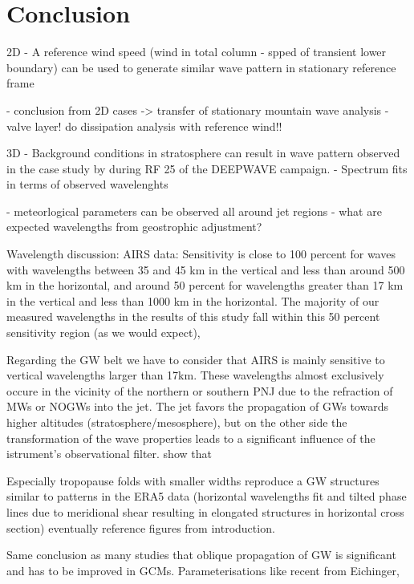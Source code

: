 \chapter{Conclusion}


2D
- A reference wind speed (wind in total column - spped of transient lower boundary) can be used to generate similar wave pattern in stationary reference frame

- conclusion from 2D cases -> transfer of stationary mountain wave analysis
- valve layer! do dissipation analysis with reference wind!!

3D
- Background conditions in stratosphere can result in wave pattern observed in the case study by \cite{dornbrack_stratospheric_2022} during RF 25 of the DEEPWAVE campaign.
- Spectrum fits in terms of observed wavelenghts

- meteorlogical parameters can be observed all around jet regions 
 - what are expected wavelengths from geostrophic adjustment?

Wavelength discussion:
AIRS data:
Sensitivity is close to 100 percent for waves with wavelengths between 35 and 45 km in the vertical and less than around 500 km in the horizontal, and around 50 percent for wavelengths greater than 17 km in the vertical and less than 1000 km in the horizontal. The majority of our measured wavelengths in the results of this study fall within this 50 percent sensitivity region (as we would expect),

Regarding the GW belt we have to consider that AIRS is mainly sensitive to vertical wavelengths larger than 17km. These wavelengths almost exclusively occure in the vicinity of the northern or southern PNJ due to the refraction of MWs or NOGWs into the jet. The jet favors the propagation of GWs towards higher altitudes (stratosphere/mesosphere), but on the other side the transformation of the wave properties leads to a significant influence of the istrument's observational filter.
\textcite[]{hindley_gravity_2019} show that 

Especially tropopause folds with smaller widths reproduce a GW structures similar to patterns in the ERA5 data (horizontal wavelengths fit and tilted phase lines due to meridional shear resulting in elongated structures in horizontal cross section) \textcite[]{dornbrack_stratospheric_2022}
eventually reference figures from introduction.


Same conclusion as many studies that oblique propagation of GW is significant and has to be improved in GCMs. Parameterisations like recent from Eichinger, 


